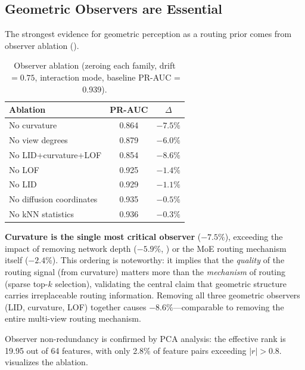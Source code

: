 \documentclass[11pt,a4paper]{article}
\begin{document}
\subsection{Geometric Observers are Essential}
\label{sec:observer_analysis}

The strongest evidence for geometric perception as a routing prior comes
from observer ablation ().

\begin{table}[t]
\centering
\caption{Observer ablation (zeroing each family, drift${}=0.75$,
interaction mode, baseline PR-AUC = 0.939).}
\label{tab:observer_analysis}
\begin{tabular}{@{}lcc@{}}
\toprule
Ablation & PR-AUC & $\Delta$ \\
\midrule
No curvature & 0.864 & $-7.5\%$ \\
No view degrees & 0.879 & $-6.0\%$ \\
No LID+curvature+LOF & 0.854 & $-8.6\%$ \\
No LOF & 0.925 & $-1.4\%$ \\
No LID & 0.929 & $-1.1\%$ \\
No diffusion coordinates & 0.935 & $-0.5\%$ \\
No kNN statistics & 0.936 & $-0.3\%$ \\
\bottomrule
\end{tabular}
\end{table}

\textbf{Curvature is the single most critical observer} ($-7.5\%$),
exceeding the impact of removing network depth ($-5.9\%$,
) or the MoE routing mechanism itself ($-2.4\%$).
This ordering is noteworthy: it implies that the \emph{quality} of the
routing signal (from curvature) matters more than the \emph{mechanism}
of routing (sparse top-$k$ selection), validating the central claim
that geometric structure carries irreplaceable routing information.
Removing all three geometric observers (LID, curvature, LOF) together
causes $-8.6\%$---comparable to removing the entire multi-view routing
mechanism.

Observer non-redundancy is confirmed by PCA analysis: the effective
rank is 19.95 out of 64 features, with only 2.8\% of feature pairs
exceeding $|r| > 0.8$.
 visualizes the ablation.
\end{document}
